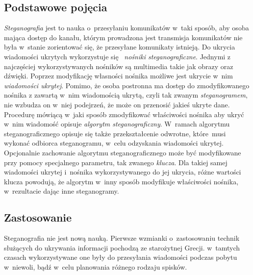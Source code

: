 \documentclass[a4paper, twoside, 12pt]{report}
\begin{document}
        \subsection{Podstawowe pojęcia} \label{STEGANOGRAFIAPOJECIA}
        \emph{Steganografia} jest to nauka o~przesyłaniu komunikatów w~taki sposób, aby
        osoba mająca dostęp do kanału, którym prowadzona jest transmisja komunikatów
        nie była w~stanie zorientować się, że przesyłane komunikaty istnieją.
        Do ukrycia wiadomości ukrytych wykorzystuje się 
        \emph{nośniki steganograficzne}\cite{STEGANOGRAFIASIECIOWAART}.
        Jednymi z najczęściej wykorzystywanych nośników są multimedia takie jak
        obrazy oraz dźwięki. Poprzez modyfikację własności nośnika możliwe jest
        ukrycie w~nim \emph{wiadomości ukrytej}. Pomimo, że osoba postronna ma
        dostęp do zmodyfikowanego nośnika z zawartą w~nim wiadomością ukrytą,
        czyli tak zwanym \emph{steganogramem}, nie wzbudza on w~niej podejrzeń,
        że może on przenosić jakieś ukryte dane. Procedurę mówiącą w~jaki sposób
        zmodyfikować właściwości nośnika aby ukryć w~nim wiadomość opisuje
        \emph{algorytm steganograficzny}. W~ramach algorytmu steganograficznego
        opisuje się także przekształcenie odwrotne, które musi
        wykonać odbiorca steganogramu, w~celu odzyskania wiadomości ukrytej.
        Opcjonalnie zachowanie algorytmu steganograficznego może być modyfikowane przy pomocy specjalnego
        parametru, tak zwanego \emph{klucza}.  Dla takiej samej wiadomości ukrytej i~nośnika
        wykorzystywanego do jej ukrycia, różne wartości klucza powodują, że algorytm
        w~inny sposób modyfikuje właściwości nośnika, w~rezultacie dając inne
        steganogramy.

        \subsection{Zastosowanie}
        Steganografia nie jest nową nauką. Pierwsze wzmianki o~zastosowaniu technik
        służących do ukrywania informacji pochodzą ze starożytnej Grecji.\cite{STEGANOGRAPHYINTRO}
        w~tamtych czasach wykorzystywane one były do przesyłania wiadomości
        podczas pobytu w~niewoli, bądź w~celu planowania różnego rodzaju spisków.
\end{document}
